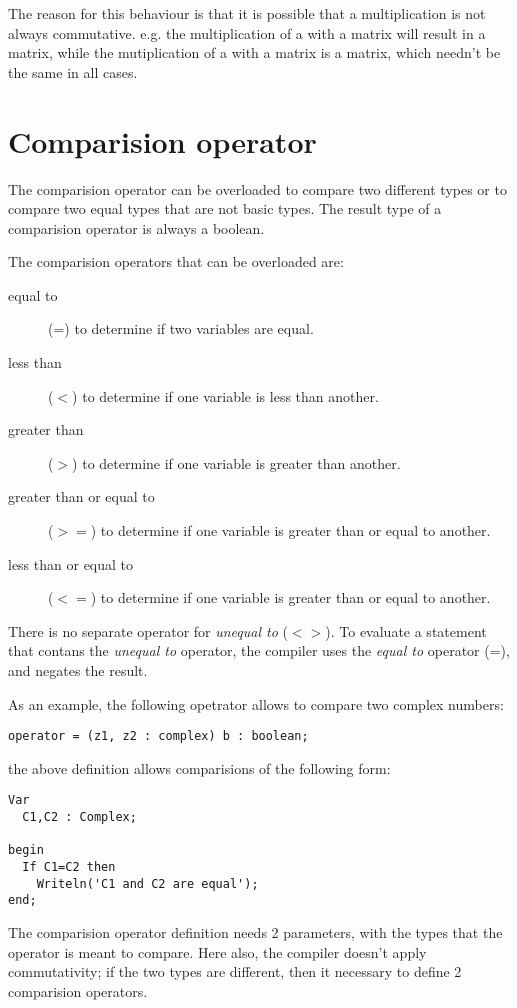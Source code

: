 The reason for this behaviour is that it is possible that a multiplication
is not always commutative. e.g. the multiplication of a  with a
 matrix will result in a  matrix, while the
mutiplication of a  with a  matrix is a 
matrix, which needn't be the same in all cases.

\section{Comparision operator}
The comparision operator can be overloaded to compare two different types
or to compare two equal types that are not basic types. The result type of
a comparision operator is always a boolean.

The comparision operators that can be overloaded are:
\begin{description}
\item[equal to] (=) to determine if two variables are equal.
\item[less than] ($<$) to determine if one variable is less than another.
\item[greater than] ($>$) to determine if one variable is greater than another.
\item[greater than or equal to] ($>=$) to determine if one variable is greater than
or equal to another.
\item[less than or equal to] ($<=$) to determine if one variable is greater
than or equal to another.
\end{description}
There is no separate operator for {\em unequal to} ($<>$). To evaluate a
statement that contans the {\em unequal to} operator, the compiler uses the
{\em equal to} operator (=), and negates the result.


As an example, the following opetrator allows to compare two complex
numbers:
\begin{verbatim}
operator = (z1, z2 : complex) b : boolean;
\end{verbatim}
the above definition allows comparisions of the following form:
\begin{verbatim}
Var
  C1,C2 : Complex;

begin
  If C1=C2 then
    Writeln('C1 and C2 are equal');
end;
\end{verbatim}

The comparision operator definition needs 2 parameters, with the types that
the operator is meant to compare. Here also, the compiler doesn't apply
commutativity; if the two types are different, then it necessary to
define 2 comparision operators.

